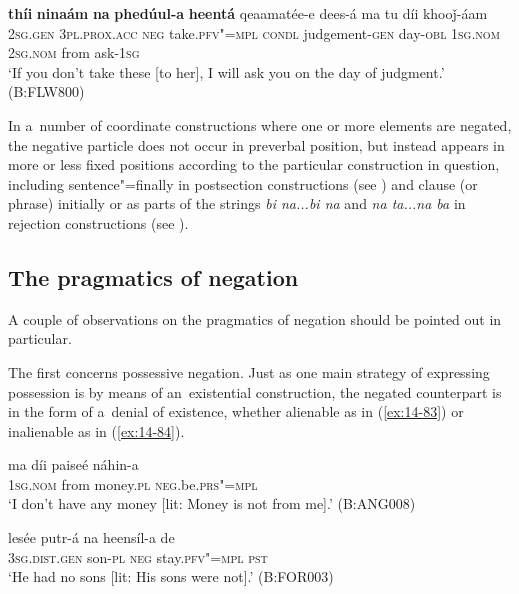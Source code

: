 \begin{exe}
\ex
\label{ex:14-82}
\gll \textbf{thíi} \textbf{ninaám} \textbf{na} \textbf{phedúul-a} \textbf{heentá}  qeaamatée-e dees-á ma tu díi khooǰ-áam \\
\textsc{2sg.gen} \textsc{3pl.prox.acc} \textsc{neg} take.\textsc{pfv"=mpl} \textsc{condl}  judgement-\textsc{gen} day-\textsc{obl} \textsc{1sg.nom} \textsc{2sg.nom} from ask-\textsc{1sg}  \\
\glt `If you don't take these [to her], I will ask you on the day of judgment.' (B:FLW800)
\end{exe}

In a~number of coordinate constructions where one or more elements are negated, the negative particle does not occur in preverbal position, but instead appears in more or less fixed positions according to the particular construction in question, including sentence"=finally in postsection constructions (see ) and clause (or phrase) initially or as parts of the strings \textit{bi na...bi na} and \textit{na ta...na ba} in rejection constructions (see ). 


\subsection{The pragmatics of negation}
\label{subsec:14-3-4}


A couple of observations on the pragmatics of negation should be pointed out in particular.


The first concerns possessive negation. Just as one main strategy of expressing possession is by means of an~existential construction, the negated counterpart is in the form of a~denial of existence, whether alienable as in (\ref{ex:14-83}) or inalienable as in (\ref{ex:14-84}).

\begin{exe}
\ex
\label{ex:14-83}
\gll ma díi paiseé náhin-a \\
\textsc{1sg.nom} from money.\textsc{pl} \textsc{neg}.be.\textsc{prs"=mpl}  \\
\glt `I don't have any money [lit: Money is not from me].' (B:ANG008)

\ex
\label{ex:14-84}
\gll lesée putr-á na heensíl-a de \\
\textsc{3sg.dist.gen} son-\textsc{pl} \textsc{neg} stay.\textsc{pfv"=mpl} \textsc{pst}  \\
\glt `He had no sons [lit: His sons were not].' (B:FOR003)
\end{exe}

